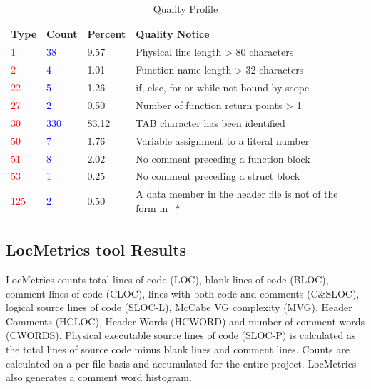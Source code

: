            
\begin{longtable}{||p{}|p{}|p{}|p{}||}
  \caption{Quality Profile}\\
    \hline\hline
    \textbf{Type} & \textbf{Count} & \textbf{Percent} & \textbf{Quality Notice} \\
    \hline\hline
    \endhead
    \hline\hline
    \endfoot
    \textcolor{red}{1} & \textcolor{blue}{38}
& 9.57
& Physical line length > 80 characters
    \\
    \hline
    \textcolor{red}{2} & \textcolor{blue}{4}
& 1.01
& Function name length > 32 characters
    \\
    \hline
    \textcolor{red}{22} & \textcolor{blue}{5}
& 1.26
& if, else, for or while not bound by scope
    \\
    \hline
    \textcolor{red}{27} & \textcolor{blue}{2}
& 0.50
& Number of function return points > 1
    \\
    \hline
    \textcolor{red}{30} & \textcolor{blue}{330}
& 83.12
& TAB character has been identified
    \\
    \hline
    \textcolor{red}{50} & \textcolor{blue}{7}
& 1.76
& Variable assignment to a literal number
    \\
    \hline
    \textcolor{red}{51} & \textcolor{blue}{8}
& 2.02
& No comment preceding a function block
    \\
    \hline
    \textcolor{red}{53} & \textcolor{blue}{1}
& 0.25
& No comment preceding a struct block
    \\
    \hline
    \textcolor{red}{125} & \textcolor{blue}{2}
& 0.50
& A data member in the header file is not of the form m\_*
    \\
    \hline
\end{longtable}

\subsection{LocMetrics tool Results}

LocMetrics counts total lines of code (LOC), blank lines of code (BLOC), comment lines of code (CLOC), lines with both code and comments (C\&SLOC), logical source lines of code (SLOC-L), McCabe VG complexity (MVG), Header Comments (HCLOC), Header Words (HCWORD) and number of comment words (CWORDS). Physical executable source lines of code (SLOC-P) is calculated as the total lines of source code minus blank lines and comment lines. Counts are calculated on a per file basis and accumulated for the entire project. LocMetrics also generates a comment word histogram.

